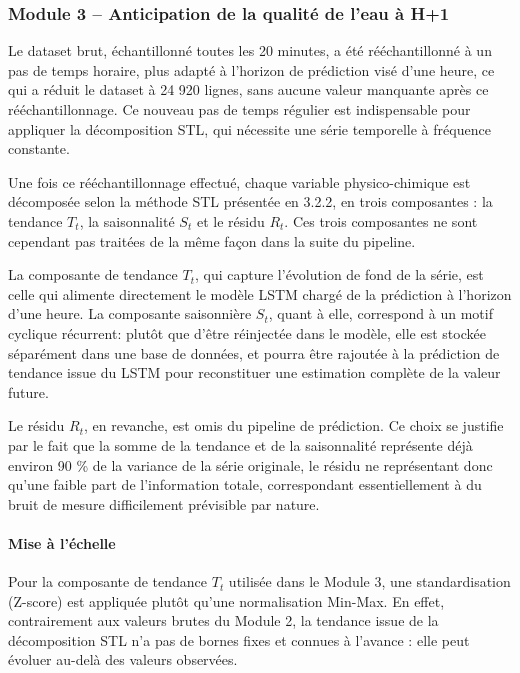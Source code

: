 \documentclass[a4paper,12pt, oneside]{article}
\begin{document}
\subsubsection[Anticipation de la qualité de l'eau à H+1]{Module 3 -- Anticipation de la qualité de l'eau à H+1\\}
Le dataset brut, échantillonné toutes les 20 minutes, a été rééchantillonné à un pas de temps horaire, plus adapté à l'horizon de prédiction visé d'une heure, ce qui a réduit le dataset à 24 920 lignes, sans aucune valeur manquante après ce rééchantillonnage. Ce nouveau pas de temps régulier est indispensable pour appliquer la décomposition STL, qui nécessite une série temporelle à fréquence constante.

Une fois ce rééchantillonnage effectué, chaque variable physico-chimique est décomposée selon la méthode STL présentée en 3.2.2, en trois composantes : la tendance $T_t$, la saisonnalité $S_t$ et le résidu $R_t$. Ces trois composantes ne sont cependant pas traitées de la même façon dans la suite du pipeline.

La composante de tendance $T_t$, qui capture l'évolution de fond de la série, est celle qui alimente directement le modèle LSTM chargé de la prédiction à l'horizon d'une heure. La composante saisonnière $S_t$, quant à elle, correspond à un motif cyclique récurrent: plutôt que d'être réinjectée dans le modèle, elle est stockée séparément dans une base de données, et pourra être rajoutée à la prédiction de tendance issue du LSTM pour reconstituer une estimation complète de la valeur future.

Le résidu $R_t$, en revanche, est omis du pipeline de prédiction. Ce choix se justifie par le fait que la somme de la tendance et de la saisonnalité représente déjà environ 90 \% de la variance de la série originale, le résidu ne représentant donc qu'une faible part de l'information totale, correspondant essentiellement à du bruit de mesure difficilement prévisible par nature.

\paragraph{Mise à l'échelle\\}
Pour la composante de tendance $T_t$ utilisée dans le Module 3, une standardisation (Z-score) est appliquée plutôt qu'une normalisation Min-Max. En effet, contrairement aux valeurs brutes du Module 2, la tendance issue de la décomposition STL n'a pas de bornes fixes et connues à l'avance : elle peut évoluer au-delà des valeurs observées.
\end{document}
